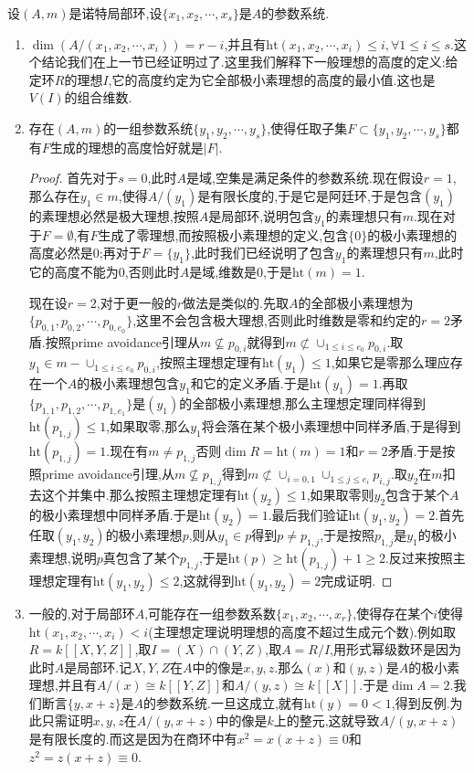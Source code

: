 设$(A,m)$是诺特局部环,设$\{x_1,x_2,\cdots,x_s\}$是$A$的参数系统.
\begin{enumerate}
	\item $\dim(A/(x_1,x_2,\cdots,x_i))=r-i$,并且有$\mathrm{ht}(x_1,x_2,\cdots,x_i)\le i,\forall 1\le i\le s$.这个结论我们在上一节已经证明过了.这里我们解释下一般理想的高度的定义:给定环$R$的理想$I$,它的高度约定为它全部极小素理想的高度的最小值.这也是$V(I)$的组合维数.
	\item 存在$(A,m)$的一组参数系统$\{y_1,y_2,\cdots,y_s\}$,使得任取子集$F\subset\{y_1,y_2,\cdots,y_s\}$都有$F$生成的理想的高度恰好就是$|F|$.
	\begin{proof}
		
		首先对于$s=0$,此时$A$是域,空集是满足条件的参数系统.现在假设$r=1$,那么存在$y_1\in m$,使得$A/(y_1)$是有限长度的,于是它是阿廷环,于是包含$(y_1)$的素理想必然是极大理想,按照$A$是局部环,说明包含$y_1$的素理想只有$m$.现在对于$F=\emptyset$,有$F$生成了零理想,而按照极小素理想的定义,包含$\{0\}$的极小素理想的高度必然是0;再对于$F=\{y_1\}$,此时我们已经说明了包含$y_1$的素理想只有$m$,此时它的高度不能为0,否则此时$A$是域,维数是0,于是$\mathrm{ht}(m)=1$.
		
		现在设$r=2$,对于更一般的$r$做法是类似的.先取$A$的全部极小素理想为$\{p_{0,1},p_{0,2},\cdots,p_{0,e_0}\}$,这里不会包含极大理想,否则此时维数是零和约定的$r=2$矛盾.按照prime avoidance引理从$m\not\subseteq p_{0,i}$就得到$m\not\subset\cup_{1\le i\le e_0}p_{0,i}$.取$y_1\in m-\cup_{1\le i\le e_0}p_{0,i}$,按照主理想定理有$\mathrm{ht}(y_1)\le1$,如果它是零那么理应存在一个$A$的极小素理想包含$y_1$和它的定义矛盾.于是$\mathrm{ht}(y_1)=1$.再取$\{p_{1,1},p_{1,2},\cdots,p_{1,e_1}\}$是$(y_1)$的全部极小素理想,那么主理想定理同样得到$\mathrm{ht}(p_{1,j})\le1$,如果取零,那么$y_1$将会落在某个极小素理想中同样矛盾,于是得到$\mathrm{ht}(p_{1,j})=1$.现在有$m\not=p_{1,j}$否则$\dim R=\mathrm{ht}(m)=1$和$r=2$矛盾.于是按照prime avoidance引理,从$m\not\subseteq p_{1,j}$得到$m\not\subset\cup_{i=0,1}\cup_{1\le j\le e_i}p_{i,j}$.取$y_2$在$m$扣去这个并集中.那么按照主理想定理有$\mathrm{ht}(y_2)\le1$,如果取零则$y_2$包含于某个$A$的极小素理想中同样矛盾.于是$\mathrm{ht}(y_2)=1$.最后我们验证$\mathrm{ht}(y_1,y_2)=2$.首先任取$(y_1,y_2)$的极小素理想$p$,则从$y_1\in p$得到$p\not=p_{1,j}$,于是按照$p_{1,j}$是$y_1$的极小素理想,说明$p$真包含了某个$p_{1,j}$,于是$\mathrm{ht}(p)\ge\mathrm{ht}(p_{1,j})+1\ge2$.反过来按照主理想定理有$\mathrm{ht}(y_1,y_2)\le2$,这就得到$\mathrm{ht}(y_1,y_2)=2$完成证明.
	\end{proof}
    \item 一般的,对于局部环$A$,可能存在一组参数系数$\{x_1,x_2,\cdots,x_r\}$,使得存在某个$i$使得$\mathrm{ht}(x_1,x_2,\cdots,x_i)<i$(主理想定理说明理想的高度不超过生成元个数).例如取$R=k[[X,Y,Z]]$,取$I=(X)\cap(Y,Z)$,取$A=R/I$,用形式幂级数环是因为此时$A$是局部环.记$X,Y,Z$在$A$中的像是$x,y,z$.那么$(x)$和$(y,z)$是$A$的极小素理想,并且有$A/(x)\cong k[[Y,Z]]$和$A/(y,z)\cong k[[X]]$.于是$\dim A=2$.我们断言$\{y,x+z\}$是$A$的参数系统.一旦这成立,就有$\mathrm{ht}(y)=0<1$,得到反例.为此只需证明$x,y,z$在$A/(y,x+z)$中的像是$k$上的整元,这就导致$A/(y,x+z)$是有限长度的.而这是因为在商环中有$x^2=x(x+z)\equiv0$和$z^2=z(x+z)\equiv0$.
\end{enumerate}

